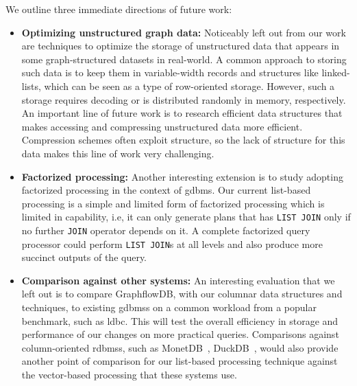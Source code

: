 We outline three immediate directions of future work:
\begin{itemize}
	\item \textbf{Optimizing unstructured graph data:} Noticeably left out from our work are techniques to optimize the storage of unstructured data that appears in some graph-structured datasets in real-world. A common approach to storing such data is to keep them in variable-width records and structures like linked-lists, which can be seen as a type of row-oriented storage. However, such a storage requires decoding or is distributed randomly in memory, respectively. An important line of future work is to research efficient data structures that makes accessing and compressing unstructured data more efficient. Compression schemes often exploit structure, so the lack of structure for this data makes this line of work very challenging. %
	
	\item \textbf{Factorized processing:} Another interesting extension is to study adopting factorized processing in the context of \gls{gdbms}. Our current list-based processing is a simple and limited form of factorized processing which is limited in capability, i.e, it can only generate plans that has \texttt{LIST JOIN} only if no further \texttt{JOIN} operator depends on it. A complete factorized query processor could perform \texttt{LIST JOIN}s at all levels and also produce more succinct outputs of the query.
	
	\item \textbf{Comparison against other systems: }An interesting evaluation that we left out is to compare GraphflowDB, with our columnar data structures and techniques, to existing \gls{gdbms}s on a common workload from a popular benchmark, such as \gls{ldbc}. This will test the overall efficiency in storage and performance of our changes on more practical queries. Comparisons against column-oriented \gls{rdbms}s, such as MonetDB~\cite{monet-2decades}, DuckDB~\cite{duckdb}, would also provide another point of comparison for our list-based processing technique against the vector-based processing that these systems use. 
	
\end{itemize}

